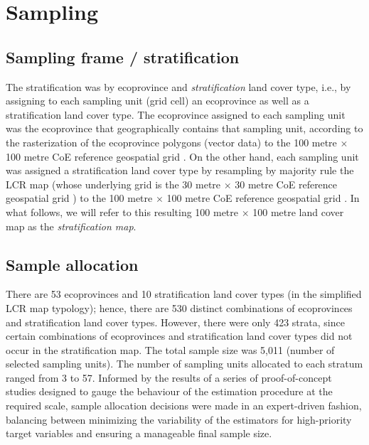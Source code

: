 

\section{Sampling}


\subsection{Sampling frame / stratification}
The stratification was by ecoprovince and \textit{stratification} land cover type,
i.e., by assigning to each sampling unit (grid cell) an ecoprovince
as well as a stratification land cover type. 
The ecoprovince assigned to each sampling unit was
the ecoprovince that geographically contains that sampling unit,
according to the rasterization of the ecoprovince polygons (vector data)
to the 100 metre $\times$ 100 metre CoE reference geospatial grid \cite{StatCanCoEGridSystem2025}.
On the other hand, each sampling unit was assigned
a stratification land cover type
by resampling by majority rule the LCR map \cite{StatCanCoELCR2025}
(whose underlying grid is the 30 metre $\times$ 30 metre
CoE reference geospatial grid \cite{StatCanCoEGridSystem2025})
to the 100 metre $\times$ 100 metre
CoE reference geospatial grid \cite{StatCanCoEGridSystem2025}. 
In what follows, we will refer to this resulting
100 metre $\times$ 100 metre land cover map
as the \textit{stratification map}.


\subsection{Sample allocation}
There are 53 ecoprovinces and 10 stratification land cover types (in the simplified LCR map 
typology); hence, there are 530 distinct combinations of ecoprovinces and stratification land 
cover types. However, there were only 423 strata, since certain combinations of 
ecoprovinces and stratification land cover types did not occur in the stratification map. The 
total sample size was 5,011 (number of selected sampling units).
The number of sampling units allocated to each stratum ranged from 3 to 57.
Informed by the results of a series of proof-of-concept studies
designed to gauge the behaviour of the estimation procedure at the required scale,
sample allocation decisions were made in an expert-driven fashion,
balancing between minimizing the variability of the estimators
for high-priority target variables and ensuring a manageable final sample size. 
 

